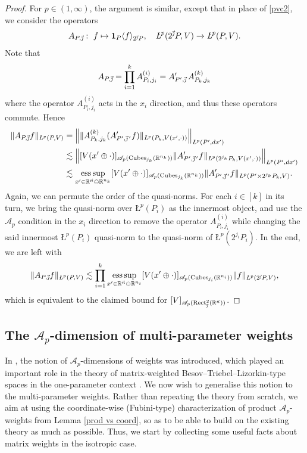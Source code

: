 \documentclass[11pt, reqno]{amsart}
\theoremstyle{definition}
\theoremstyle{remark}
\numberwithin{equation}{section}
\newcommand{\A}{\mathscr A}
\newcommand{\R}{\mathbb R}
\newcommand{\vj}{\vec{\textit{\j}}}
\newcommand{\vjprime}{\vj\,{}'}
\newcommand{\vn}{\vec n}
\newcommand{\esssup}{\operatornamewithlimits{ess\,sup}}
\newcommand{\one}{\mathbf{1}}
\newcommand{\ave}[1]{\langle #1\rangle}
\newcommand{\aveL}{\textit{\L}}
\newcommand{\Norm}[2]{\|#1\|_{#2}}
\newcommand{\BNorm}[2]{\Big\|#1\Big\|_{#2}}
\newcommand{\Cubes}{\mathrm{Cubes}}
\newcommand{\Rect}{\mathrm{Rect}}
\begin{document}
\begin{proof}
For $p\in(1,\infty)$, the argument is similar, except that in place of \eqref{pvc2}, we consider the operators
\begin{equation*}
A_{P,\vj}:\ f\mapsto\one_P\ave{f}_{2^{\vj}P},
\quad\aveL^p(2^{\vj}P,V)\to\aveL^p(P,V).
\end{equation*}
Note that
\begin{equation*}
A_{P,\vj}=\prod_{i=1}^k A_{P_i,j_i}^{(i)}=A_{P',\vj}'\,A_{P_k,j_k}^{(k)}
\end{equation*}
where the operator $A_{P_i,j_i}^{(i)}$ acts in the $x_i$ direction, and thus these operators commute. Hence
\begin{align*}
\Norm{A_{P,\vj}f}{\aveL^p(P,V)}
&=\BNorm{\Norm{A_{P_k,j_k}^{(k)}(A_{P',\vjprime}'f)}{\aveL^p(P_k,V(x',\cdot))}}{\aveL^p(P',dx')} \\
&\lesssim \BNorm{ [V(x'\oplus\cdot)]_{\A_p(\Cubes_{j_k}(\R^{n_k}))}\Norm{A_{P',\vjprime}'f}
{\aveL^p(2^{j_k}P_k,V(x',\cdot))}}{\aveL^p(P',dx')} \\
&\lesssim\esssup_{x'\in\R^{\vn}\ominus\R^{n_k}}[V(x'\oplus\cdot)]_{\A_p(\Cubes_{j_k}
(\R^{n_k}))}\Norm{A_{P',\vjprime}'f}{\aveL^p(P'\times 2^{j_k}P_k,V)}.
\end{align*}
Again, we can permute the order of the quasi-norms. For each $i\in[k]$ in its turn, we bring the quasi-norm over $\aveL^p(P_i)$ as the innermost object, and use the $\A_p$ condition in the $x_i$ direction to remove the
operator $A_{P_i,j_i}^{(i)}$ while changing the said innermost $\aveL^p(P_i)$ quasi-norm to the quasi-norm of $\aveL^p(2^{j_i}P_i)$. In the end, we are left with
\begin{equation*}
\Norm{A_{P,\vj}f}{\aveL^p(P,V)}
\lesssim\prod_{i=1}^k \esssup_{x'\in\R^{\vn}\ominus\R^{n_i}}[V(x'\oplus\cdot)]_{\A_p(\Cubes_{j_i}(\R^{n_i}))}
\Norm{f}{\aveL^p(2^{\vj}P,V)},
\end{equation*}
which is equivalent to the claimed bound for $[V]_{\A_p(\Rect^2_{\vj}(\R^{\vn}))}$.
\end{proof}

\subsection{The $\A_p$-dimension of multi-parameter weights} \label{Ap dim}

In \cite{BHYY:1a}, the notion of $\A_p$-dimensions of weights was introduced,
which played an important role in the theory of matrix-weighted Besov--Triebel--Lizorkin-type spaces
in the one-parameter context \cite{BHYY:1a,BHYY:1b,BHYY:1c}.
We now wish to generalise this notion to the multi-parameter weights.
Rather than repeating the theory from scratch,
we aim at using the coordinate-wise (Fubini-type) characterization of
product $\A_p$-weights from Lemma \ref{prod vs coord},
so as to be able to build on the existing theory as much as possible.
Thus, we start by collecting some useful facts about matrix weights in the isotropic case.
\end{document}

